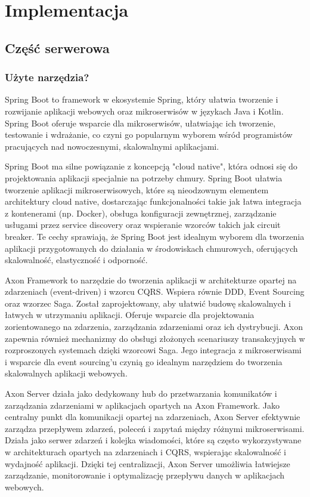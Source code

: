 \clearpage %

\section{Implementacja}

\subsection{Część serwerowa}

\subsubsection{Użyte narzędzia?}

Spring Boot \cite{springboot} to framework w ekosystemie Spring, który ułatwia tworzenie i rozwijanie aplikacji webowych oraz mikroserwisów w językach Java i Kotlin. Spring Boot oferuje wsparcie dla mikroserwisów, ułatwiając ich tworzenie, testowanie i wdrażanie, co czyni go popularnym wyborem wśród programistów pracujących nad nowoczesnymi, skalowalnymi aplikacjami.

Spring Boot ma silne powiązanie z koncepcją "cloud native", która odnosi się do projektowania aplikacji specjalnie na potrzeby chmury. Spring Boot ułatwia tworzenie aplikacji mikroserwisowych, które są nieodzownym elementem architektury cloud native, dostarczając funkcjonalności takie jak łatwa integracja z kontenerami (np. Docker), obsługa konfiguracji zewnętrznej, zarządzanie usługami przez service discovery oraz wspieranie wzorców takich jak circuit breaker. Te cechy sprawiają, że Spring Boot jest idealnym wyborem dla tworzenia aplikacji przygotowanych do działania w środowiskach chmurowych, oferujących skalowalność, elastyczność i odporność.

Axon Framework to narzędzie do tworzenia aplikacji w architekturze opartej na zdarzeniach (event-driven) i wzorcu CQRS. Wspiera równie DDD, Event Sourcing oraz wzorzec Saga. Został zaprojektowany, aby ułatwić budowę skalowalnych i łatwych w utrzymaniu aplikacji. Oferuje wsparcie dla projektowania zorientowanego na zdarzenia, zarządzania zdarzeniami oraz ich dystrybucji. Axon zapewnia również mechanizmy do obsługi złożonych scenariuszy transakcyjnych w rozproszonych systemach dzięki wzorcowi Saga. Jego integracja z mikroserwisami i wsparcie dla event sourcing'u czynią go idealnym narzędziem do tworzenia skalowalnych aplikacji webowych.

Axon Server działa jako dedykowany hub do przetwarzania komunikatów i zarządzania zdarzeniami w aplikacjach opartych na Axon Framework. Jako centralny punkt dla komunikacji opartej na zdarzeniach, Axon Server efektywnie zarządza przepływem zdarzeń, poleceń i zapytań między różnymi mikroserwisami. Działa jako serwer zdarzeń i kolejka wiadomości, które są często wykorzystywane w architekturach opartych na zdarzeniach i CQRS, wspierając skalowalność i wydajność aplikacji. Dzięki tej centralizacji, Axon Server umożliwia łatwiejsze zarządzanie, monitorowanie i optymalizację przepływu danych w aplikacjach webowych.

